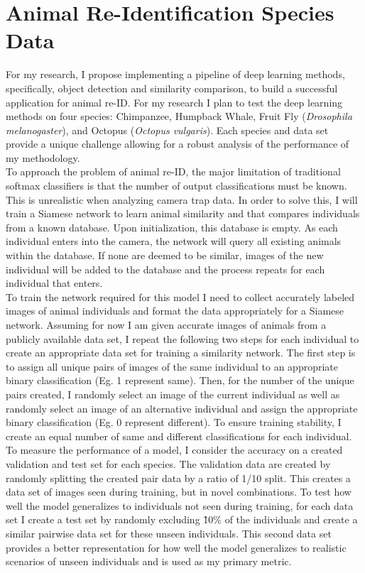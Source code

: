 \documentclass[11pt]{article}
\begin{document}
\section*{Animal Re-Identification Species Data}

For my research, I propose implementing a pipeline of deep learning methods, specifically, object detection and similarity comparison, to build a successful application for animal re-ID. For my research I plan to test the deep learning methods on four species: Chimpanzee, Humpback Whale, Fruit Fly (\textit{Drosophila melanogaster}), and Octopus (\textit{Octopus vulgaris}). Each species and data set provide a unique challenge allowing for a robust analysis of the performance of my methodology. 
\newline
\\
To approach the problem of animal re-ID, the major limitation of traditional softmax classifiers is that the number of output classifications must be known. This is unrealistic when analyzing camera trap data. In order to solve this, I will train a Siamese network to learn animal similarity and that compares individuals from a known database. Upon initialization, this database is empty. As each individual enters into the camera, the network will query all existing animals within the database. If none are deemed to be similar, images of the new individual will be added to the database and the process repeats for each individual that enters. 
\newline
\\
To train the network required for this model I need to collect accurately labeled images of animal individuals and format the data appropriately for a Siamese network. Assuming for now I am given accurate images of animals from a publicly available data set, I repeat the following two steps for each individual to create an appropriate data set for training a similarity network. The first step is to assign all unique pairs of images of the same individual to an appropriate binary classification (Eg. 1 represent same). Then, for the number of the unique pairs created, I randomly select an image of the current individual as well as randomly select an image of an alternative individual and assign the appropriate binary classification (Eg. 0 represent different). To ensure training stability, I create an equal number of same and different classifications for each individual. 
\newline
\\
To measure the performance of a model, I consider the accuracy on a created validation and test set for each species. The validation data are created by randomly splitting the created pair data by a ratio of 1/10 split. This creates a data set of images seen during training, but in novel combinations. To test how well the model generalizes to individuals not seen during training, for each data set I create a test set by randomly excluding \~10\% of the individuals and create a similar pairwise data set for these unseen individuals. This second data set provides a better representation for how well the model generalizes to realistic scenarios of unseen individuals and is used as my primary metric. 
\end{document}
